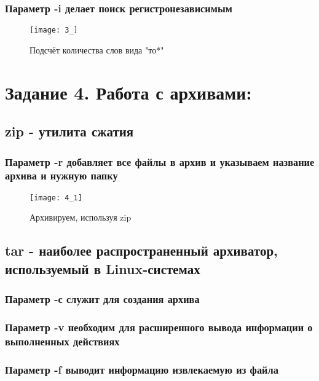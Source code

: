 \subsubsection{Параметр -i делает поиск регистронезависимым}

\begin{figure}[H]
	\begin{center}
		\texttt{[image: 3\_]}
		\caption{Подсчёт количества слов вида "то*"} 
		\label{pic:pic_1} %
	\end{center}
\end{figure}

\section{Задание 4. Работа с архивами:}

\subsection{zip - утилита сжатия}

\subsubsection{Параметр -r добавляет все файлы в архив и указываем название архива и нужную папку}

\begin{figure}[H]
	\begin{center}
		\texttt{[image: 4\_1]}
		\caption{Архивируем, используя zip} 
		\label{pic:pic_1} %
	\end{center}
\end{figure}

\subsection{tar - наиболее распространенный архиватор, используемый в Linux-системах}

\subsubsection{Параметр -с служит для создания архива}
\subsubsection{Параметр -v необходим для расширенного вывода информации о выполненных действиях}
\subsubsection{Параметр -f выводит информацию извлекаемую из файла}

